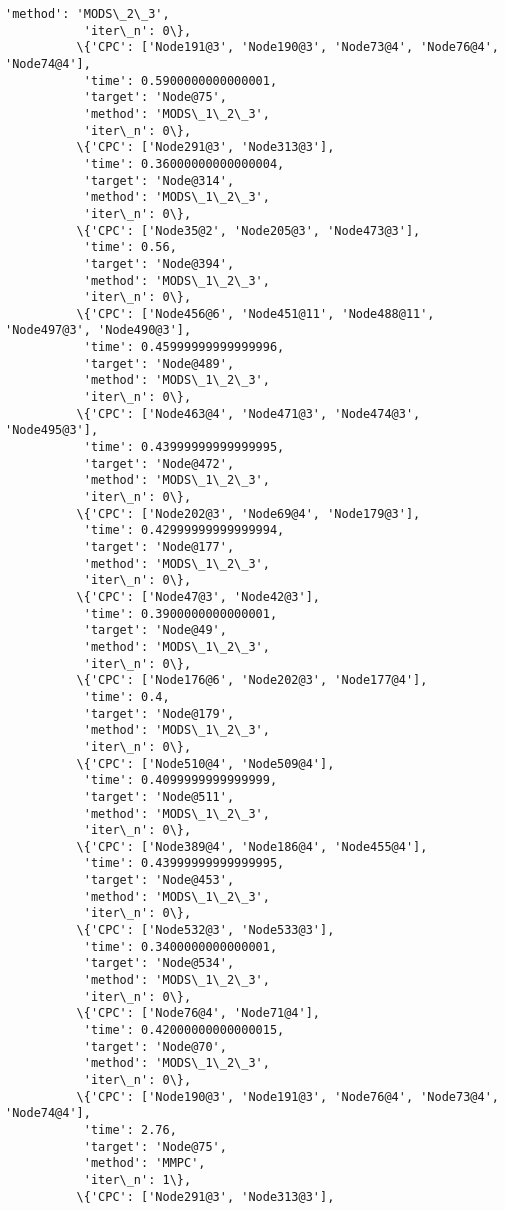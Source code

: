 \documentclass[11pt]{article}
\begin{document}
\begin{Verbatim}[commandchars=\\\{\}]
           'method': 'MODS\_2\_3',
           'iter\_n': 0\},
          \{'CPC': ['Node191@3', 'Node190@3', 'Node73@4', 'Node76@4', 'Node74@4'],
           'time': 0.5900000000000001,
           'target': 'Node@75',
           'method': 'MODS\_1\_2\_3',
           'iter\_n': 0\},
          \{'CPC': ['Node291@3', 'Node313@3'],
           'time': 0.36000000000000004,
           'target': 'Node@314',
           'method': 'MODS\_1\_2\_3',
           'iter\_n': 0\},
          \{'CPC': ['Node35@2', 'Node205@3', 'Node473@3'],
           'time': 0.56,
           'target': 'Node@394',
           'method': 'MODS\_1\_2\_3',
           'iter\_n': 0\},
          \{'CPC': ['Node456@6', 'Node451@11', 'Node488@11', 'Node497@3', 'Node490@3'],
           'time': 0.45999999999999996,
           'target': 'Node@489',
           'method': 'MODS\_1\_2\_3',
           'iter\_n': 0\},
          \{'CPC': ['Node463@4', 'Node471@3', 'Node474@3', 'Node495@3'],
           'time': 0.43999999999999995,
           'target': 'Node@472',
           'method': 'MODS\_1\_2\_3',
           'iter\_n': 0\},
          \{'CPC': ['Node202@3', 'Node69@4', 'Node179@3'],
           'time': 0.42999999999999994,
           'target': 'Node@177',
           'method': 'MODS\_1\_2\_3',
           'iter\_n': 0\},
          \{'CPC': ['Node47@3', 'Node42@3'],
           'time': 0.3900000000000001,
           'target': 'Node@49',
           'method': 'MODS\_1\_2\_3',
           'iter\_n': 0\},
          \{'CPC': ['Node176@6', 'Node202@3', 'Node177@4'],
           'time': 0.4,
           'target': 'Node@179',
           'method': 'MODS\_1\_2\_3',
           'iter\_n': 0\},
          \{'CPC': ['Node510@4', 'Node509@4'],
           'time': 0.4099999999999999,
           'target': 'Node@511',
           'method': 'MODS\_1\_2\_3',
           'iter\_n': 0\},
          \{'CPC': ['Node389@4', 'Node186@4', 'Node455@4'],
           'time': 0.43999999999999995,
           'target': 'Node@453',
           'method': 'MODS\_1\_2\_3',
           'iter\_n': 0\},
          \{'CPC': ['Node532@3', 'Node533@3'],
           'time': 0.3400000000000001,
           'target': 'Node@534',
           'method': 'MODS\_1\_2\_3',
           'iter\_n': 0\},
          \{'CPC': ['Node76@4', 'Node71@4'],
           'time': 0.42000000000000015,
           'target': 'Node@70',
           'method': 'MODS\_1\_2\_3',
           'iter\_n': 0\},
          \{'CPC': ['Node190@3', 'Node191@3', 'Node76@4', 'Node73@4', 'Node74@4'],
           'time': 2.76,
           'target': 'Node@75',
           'method': 'MMPC',
           'iter\_n': 1\},
          \{'CPC': ['Node291@3', 'Node313@3'],

\end{Verbatim}
\end{document}

